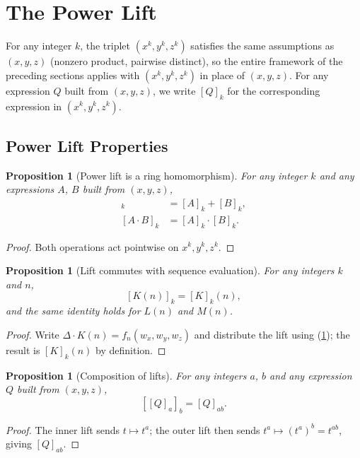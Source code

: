 \documentclass[12pt]{article}
\newtheorem{proposition}[theorem]{Proposition}
\theoremstyle{definition}
\newcommand{\lift}[2]{[#1]_{#2}}
\newcommand{\wx}{w_x}
\newcommand{\wy}{w_y}
\newcommand{\wz}{w_z}
\begin{document}
	\section{The Power Lift}
	\label{sec:power_lift}
	
	For any integer $k$, the triplet $(x^k, y^k, z^k)$ satisfies the same assumptions as $(x, y, z)$
	(nonzero product, pairwise distinct), so the entire framework of the preceding sections applies
	with $(x^k, y^k, z^k)$ in place of $(x, y, z)$. For any expression $Q$
	built from $(x, y, z)$, we write $\lift{Q}{k}$ for the corresponding expression in $(x^k, y^k, z^k)$.
	
	\subsection{Power Lift Properties}
	\begin{proposition}[Power lift is a ring homomorphism]
		\label{prop:plift_homomorphism}
		For any integer $k$ and any expressions $A$, $B$ built from $(x, y, z)$,
		\begin{align*}
			\lift{A + B}{k} &= \lift{A}{k} + \lift{B}{k}, \\
			\lift{A \cdot B}{k} &= \lift{A}{k} \cdot \lift{B}{k}.
		\end{align*}
	\end{proposition}
	\begin{proof}
		Both operations act pointwise on $x^k, y^k, z^k$.
	\end{proof}
	
	\begin{proposition}[Lift commutes with sequence evaluation]
		\label{prop:lift_commutes_eval}
		For any integers $k$ and $n$,
		\[ \lift{K(n)}{k} = \lift{K}{k}(n), \]
		and the same identity holds for $L(n)$ and $M(n)$.
	\end{proposition}
	\begin{proof}
		Write $\Delta \cdot K(n) = f_n(\wx, \wy, \wz)$ and distribute the lift using (\ref{prop:plift_homomorphism}); the result is $\lift{K}{k}(n)$ by definition.
	\end{proof}
	
	\begin{proposition}[Composition of lifts]
		\label{prop:lift_composition}
		For any integers $a$, $b$ and any expression $Q$ built from $(x, y, z)$,
		\[ \lift{\lift{Q}{a}}{b} = \lift{Q}{ab}. \]
	\end{proposition}
	\begin{proof}
		The inner lift sends $t \mapsto t^a$; the outer lift then sends $t^a \mapsto (t^a)^b = t^{ab}$, giving $\lift{Q}{ab}$.
	\end{proof}
	
\end{document}
